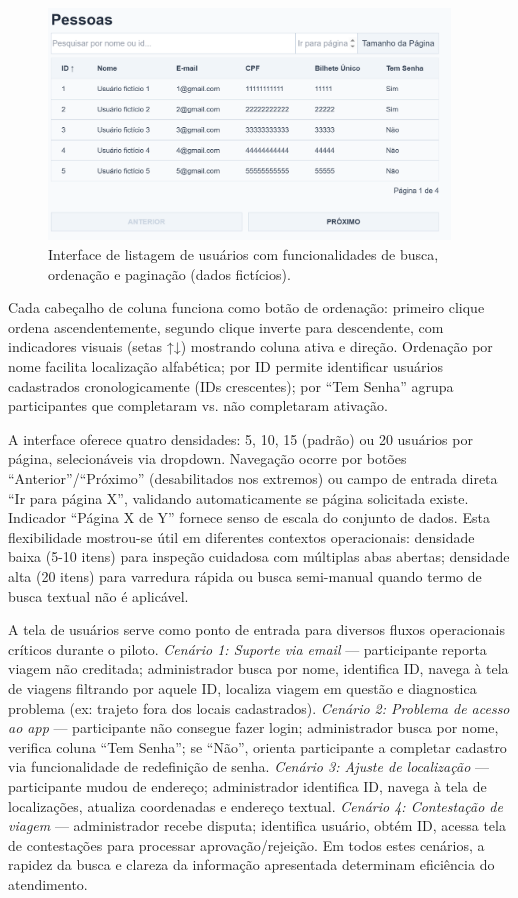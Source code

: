 \begin{figure}[htb]
    \centering
    \includegraphics[width=0.95\textwidth]{figuras/pessoas.PNG}
    \caption{Interface de listagem de usuários com funcionalidades de busca, ordenação e paginação (dados fictícios).}
    \label{fig:usuarios_listagem}
  \end{figure}

Cada cabeçalho de coluna funciona como botão de
ordenação: primeiro clique ordena ascendentemente, segundo clique inverte para
descendente, com indicadores visuais (setas ↑↓) mostrando coluna ativa e direção.
Ordenação por nome facilita localização alfabética; por ID permite identificar
usuários cadastrados cronologicamente (IDs crescentes); por ``Tem Senha'' agrupa
participantes que completaram vs. não completaram ativação.

A interface oferece quatro densidades: 5, 10, 15
(padrão) ou 20 usuários por página, selecionáveis via dropdown. Navegação ocorre por
botões ``Anterior''/``Próximo'' (desabilitados nos extremos) ou campo de entrada
direta ``Ir para página X'', validando automaticamente se página solicitada existe.
Indicador ``Página X de Y'' fornece senso de escala do conjunto de dados. Esta
flexibilidade mostrou-se útil em diferentes contextos operacionais: densidade baixa
(5-10 itens) para inspeção cuidadosa com múltiplas abas abertas; densidade alta
(20 itens) para varredura rápida ou busca semi-manual quando termo de busca textual
não é aplicável.

A tela de usuários serve como ponto de
entrada para diversos fluxos operacionais críticos durante o piloto. \textit{Cenário
1: Suporte via email} --- participante reporta viagem não creditada; administrador
busca por nome, identifica ID, navega à tela de viagens filtrando por aquele ID,
localiza viagem em questão e diagnostica problema (ex: trajeto fora dos locais
cadastrados). \textit{Cenário 2: Problema de acesso ao app} --- participante não
consegue fazer login; administrador busca por nome, verifica coluna ``Tem Senha''; se
``Não'', orienta participante a completar cadastro via funcionalidade de redefinição
de senha. \textit{Cenário 3: Ajuste de localização} --- participante mudou de
endereço; administrador identifica ID, navega à tela de localizações, atualiza
coordenadas e endereço textual. \textit{Cenário 4: Contestação de viagem} ---
administrador recebe disputa; identifica usuário, obtém ID, acessa tela de
contestações para processar aprovação/rejeição. Em todos estes cenários, a rapidez
da busca e clareza da informação apresentada determinam eficiência do atendimento.

